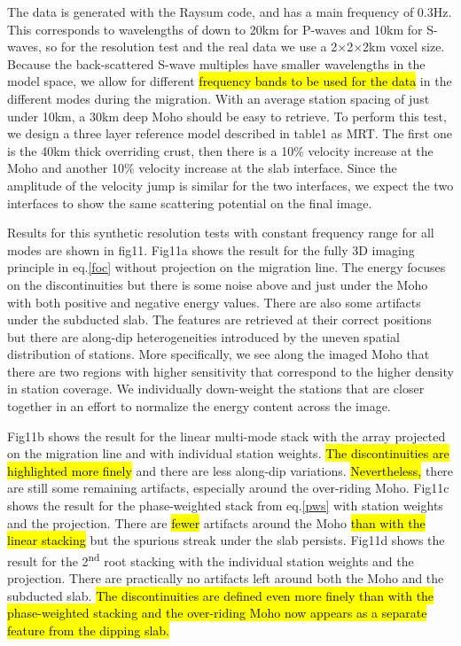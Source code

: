 \documentclass[10pt,a4paper]{article}
\begin{document}
The data is generated with the Raysum code, and has a main frequency of 0.3Hz.
This corresponds to wavelengths of down to 20km for P-waves and 10km for S-waves, so for the resolution test and the real data we use a 2$\times$2$\times$2km voxel size.
Because the back-scattered S-wave multiples have smaller wavelengths in the model space, we allow for different \hl{frequency bands to be used for the data} in the different modes during the migration.
With an average station spacing of just under 10km, a 30km deep Moho should be easy to retrieve.
To perform this test, we design a three layer reference model described in table1 as MRT.
The first one is the 40km thick overriding crust, then there is a 10\% velocity increase at the Moho and another 10\% velocity increase at the slab interface.
Since the amplitude of the velocity jump is similar for the two interfaces, we expect the two interfaces to show the same scattering potential on the final image.

Results for this synthetic resolution tests with constant frequency range for all modes are shown in fig11.
Fig11a shows the result for the fully 3D imaging principle in eq.\eqref{foc} without projection on the migration line.
The energy focuses on the discontinuities but there is some noise above and just under the Moho with both positive and negative energy values.
There are also some artifacts under the subducted slab.
The features are retrieved at their correct positions but there are along-dip heterogeneities introduced by the uneven spatial distribution of stations.
More specifically, we see along the imaged Moho that there are two regions with higher sensitivity that correspond to the higher density in station coverage.
We individually down-weight the stations that are closer together in an effort to normalize the energy content across the image.

Fig11b shows the result for the linear multi-mode stack with the array projected on the migration line and with individual station weights.
\hl{The discontinuities are highlighted more finely} and there are less along-dip variations.
\hl{Nevertheless,} there are still some remaining artifacts, especially around the over-riding Moho.
Fig11c shows the result for the phase-weighted stack from eq.\eqref{pws} with station weights and the projection.
There are \hl{fewer} artifacts around the Moho \hl{than with the linear stacking} but the spurious streak under the slab persists.
Fig11d shows the result for the 2\textsuperscript{nd} root stacking with the individual station weights and the projection.
There are practically no artifacts left around both the Moho and the subducted slab.
\hl{The discontinuities are defined even more finely than with the phase-weighted stacking and the over-riding Moho now appears as a separate feature from the dipping slab.}
\end{document}
